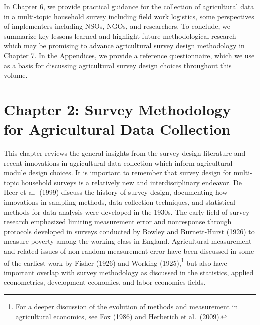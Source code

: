 \documentclass[
]{book}
\begin{document}
In Chapter 6, we provide practical guidance for the collection of agricultural data in a multi-topic household survey including field work logistics, some perspectives of implementers including NSOs, NGOs, and researchers. To conclude, we summarize key lessons learned and highlight future methodological research which may be promising to advance agricultural survey design methodology in Chapter 7. In the Appendices, we provide a reference questionnaire, which we use as a basis for discussing agricultural survey design choices throughout this volume.

\hypertarget{chapter-2-survey-methodology-for-agricultural-data-collection}{%
\chapter{Chapter 2: Survey Methodology for Agricultural Data Collection}\label{chapter-2-survey-methodology-for-agricultural-data-collection}}

This chapter reviews the general insights from the survey design literature and recent innovations in agricultural data collection which inform agricultural module design choices. It is important to remember that survey design for multi-topic household surveys is a relatively new and interdisciplinary endeavor. De Heer et al.~(1999) discuss the history of survey design, documenting how innovations in sampling methods, data collection techniques, and statistical methods for data analysis were developed in the 1930s. The early field of survey research emphasized limiting measurement error and nonresponse through protocols developed in surveys conducted by Bowley and Burnett-Hurst (1926) to measure poverty among the working class in England. Agricultural measurement and related issues of non-random measurement error have been discussed in some of the earliest work by Fisher (1926) and Working (1925),\footnote{For a deeper discussion of the evolution of methods and measurement in agricultural economics, see Fox (1986) and Herberich et al.~(2009).} but also have important overlap with survey methodology as discussed in the statistics, applied econometrics, development economics, and labor economics fields.
\end{document}
